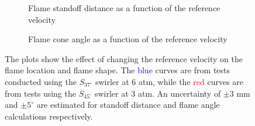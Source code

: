 \begin{figure}

\begin{subfigure}{\linewidth}
  \centering
  
  \caption{Flame standoff distance as a function of the reference velocity}
  \label{fig:referenceVelocityDistance}
\end{subfigure}

\begin{subfigure}{\linewidth}
  \centering
  
  \caption{Flame cone angle as a function of the reference velocity}
  \label{fig:referenceVelocityAngle}
\end{subfigure}

\caption[Effect of reference velocity on the flame location and shape]{The plots show the effect of changing the reference velocity on the flame location and flame shape. The \textcolor{blue}{blue} curves are from tests conducted using the \(S_{37^\circ}\) swirler at 6 atm, while the \textcolor{red}{red} curves are from tests using the \(S_{45^\circ}\) swirler at 3 atm. An uncertainty of \(\pm 3\) mm and \(\pm 5^\circ\) are estimated for standoff distance and flame angle calculations respectively.}


\label{fig:referenceVelocityResults}

\end{figure}

